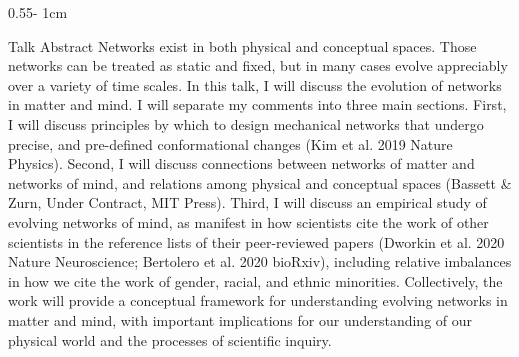\documentclass{../psuposter}
\begin{document}
\begin{frame}
\begin{columns}[t, totalwidth=\textwidth]
\begin{column}{0.55\textwidth - 1cm}
    \begin{block}{Talk Abstract}
    	Networks exist in both physical and conceptual spaces. Those networks can be treated as static and fixed, but in many cases evolve appreciably over a variety of time scales. In this talk, I will discuss the evolution of networks in matter and mind. I will separate my comments into three main sections. First, I will discuss principles by which to design mechanical networks that undergo precise, and pre-defined conformational changes (Kim et al. 2019 Nature Physics). Second, I will discuss connections between networks of matter and networks of mind, and relations among physical and conceptual spaces (Bassett \& Zurn, Under Contract, MIT Press). Third, I will discuss an empirical study of evolving networks of mind, as manifest in how scientists cite the work of other scientists in the reference lists of their peer-reviewed papers (Dworkin et al. 2020 Nature Neuroscience; Bertolero et al. 2020 bioRxiv), including relative imbalances in how we cite the work of gender, racial, and ethnic minorities. \cite{dworkinExtentDriversGender2020} Collectively, the work will provide a conceptual framework for understanding evolving networks in matter and mind, with important implications for our understanding of our physical world and the processes of scientific inquiry.
    \end{block}



\end{column}
\end{columns}
\end{frame}
\end{document}
